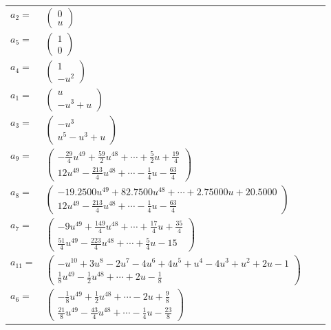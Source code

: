 \documentclass[1p]{elsarticle_modified}
\theoremstyle{definition}
\begin{document}
\begin{tabular}{m{7pt} m{180pt} m{7pt} m{180pt} }
\flushright $a_{2}=$&$\begin{pmatrix}0\\u\end{pmatrix}$ \\
\flushright $a_{5}=$&$\begin{pmatrix}1\\0\end{pmatrix}$ \\
\flushright $a_{4}=$&$\begin{pmatrix}1\\- u^2\end{pmatrix}$ \\
\flushright $a_{1}=$&$\begin{pmatrix}u\\- u^3+u\end{pmatrix}$ \\
\flushright $a_{3}=$&$\begin{pmatrix}- u^3\\u^5- u^3+u\end{pmatrix}$ \\
\flushright $a_{9}=$&$\begin{pmatrix}-\frac{29}{4} u^{49}+\frac{59}{2} u^{48}+\cdots+\frac{5}{2} u+\frac{19}{4}\\12 u^{49}-\frac{213}{4} u^{48}+\cdots-\frac{1}{4} u-\frac{63}{4}\end{pmatrix}$ \\
\flushright $a_{8}=$&$\begin{pmatrix}-19.2500 u^{49}+82.7500 u^{48}+\cdots+2.75000 u+20.5000\\12 u^{49}-\frac{213}{4} u^{48}+\cdots-\frac{1}{4} u-\frac{63}{4}\end{pmatrix}$ \\
\flushright $a_{7}=$&$\begin{pmatrix}-9 u^{49}+\frac{149}{4} u^{48}+\cdots+\frac{17}{4} u+\frac{35}{4}\\\frac{51}{4} u^{49}-\frac{223}{4} u^{48}+\cdots+\frac{5}{4} u-15\end{pmatrix}$ \\
\flushright $a_{11}=$&$\begin{pmatrix}- u^{10}+3 u^8-2 u^7-4 u^6+4 u^5+u^4-4 u^3+u^2+2 u-1\\\frac{1}{8} u^{49}-\frac{1}{2} u^{48}+\cdots+2 u-\frac{1}{8}\end{pmatrix}$ \\
\flushright $a_{6}=$&$\begin{pmatrix}-\frac{1}{8} u^{49}+\frac{1}{2} u^{48}+\cdots-2 u+\frac{9}{8}\\\frac{21}{8} u^{49}-\frac{43}{4} u^{48}+\cdots-\frac{1}{4} u-\frac{23}{8}\end{pmatrix}$ \\

\end{tabular}
\end{document}
